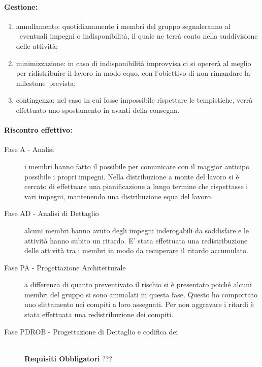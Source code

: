 \documentclass[../PianoProgetto.tex]{subfiles}
\begin{document}
	\paragraph*{Gestione:}
	\begin{enumerate}
		\item annullamento: quotidianamente i membri del gruppo segnaleranno al \responsabilediprogetto\ eventuali impegni o indisponibilità, il quale ne terrà conto nella suddivisione delle attività;
		\item minimizzazione: in caso di indisponibilità improvvisa ci si opererà al meglio per ridistribuire il lavoro in modo equo, con l'obiettivo di non rimandare la milestone\g\ prevista;
		\item contingenza: nel caso in cui fosse impossibile rispettare le tempistiche, verrà effettuato uno spostamento in avanti della consegna.
	\end{enumerate}
		
		
	\paragraph*{Riscontro effettivo:}
		\begin{description}
			\item[Fase A - Analisi] i membri hanno fatto il possibile per comunicare con il maggior anticipo possibile i propri impegni. Nella distribuzione a monte del lavoro si è cercato di effettuare una pianificazione a lungo termine che rispettasse i vari impegni, mantenendo una distribuzione equa del lavoro.
			\item[Fase AD - Analisi di Dettaglio] alcuni membri hanno avuto degli impegni inderogabili da soddisfare e le attività hanno subito un ritardo. E' stata effettuata una redistribuzione delle attività tra i membri in modo da recuperare il ritardo accumulato. 
			\item[Fase PA - Progettazione Architetturale] a differenza  di quanto preventivato il rischio si è presentato poiché alcuni membri del gruppo si sono ammalati in questa fase. Questo ho comportato uno slittamento nei compiti a loro assegnati. Per non aggravare i ritardi è stata effettuata una redistribuzione dei compiti.
			\item[Fase PDROB - Progettazione di Dettaglio e codifica dei]  \ \\
					\textbf{Requisiti Obbligatori} ???
		\end{description}
	
\end{document}
